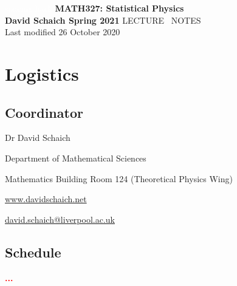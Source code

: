 \documentclass[12 pt]{article}
\newcommand{\mutesection}[1]{\vspace{-\medskipamount}\section*{#1}\vspace{-\medskipamount}}
\newcommand{\mutesubsection}[1]{\vspace{-\medskipamount}\subsection*{#1}\vspace{-\medskipamount}}
\newcommand{\TODO}[1]{\textcolor{red}{\textbf{#1}}}
\begin{document}
\begin{center}
  \textcolor{white}{spacing hack}
  \vfill
  {\LARGE \textbf{MATH327: Statistical Physics}} \\[6 pt]
  \textbf{David Schaich \qquad\qquad\qquad\qquad Spring 2021}
  \vfill
  {\LARGE LECTURE \ NOTES} \\[6 pt]
  Last modified 26 October 2020
  \vfill
\end{center}
\clearpage



\mutesection{Logistics}
\mutesubsection{Coordinator}
\begin{description}
  \setlength{\itemsep}{1pt}
  \setlength{\parskip}{0pt}
  \setlength{\parsep}{0pt}
  \item[\qquad] Dr David Schaich
  \item[\qquad] Department of Mathematical Sciences
  \item[\qquad] Mathematics Building Room 124 (Theoretical Physics Wing)
  \item[\qquad] \href{http://www.davidschaich.net}{www.davidschaich.net}
  \item[\qquad] \href{mailto:david.schaich@liverpool.ac.uk}{david.schaich@liverpool.ac.uk}
\end{description}

\mutesubsection{Schedule}
\TODO{...}
\begin{comment}
\begin{tabular}{|l|p{12cm}|}
  \hline
  \textbf{Weeks 1--7:}  & We will have \textit{three hours of lecture} and \textit{one tutorial}.
                          There will be question sheets for the tutorials.
                          You will work through part of these questions in your time before the tutorial (non-assessed).
                          Key elements will be discussed in the tutorial. \\[12 pt]
  \hline
  \textbf{Week 8--10:}  & We will have \textit{two hours of lecture} and \textit{two hours Computer Lab}.
                          In the Computer Lab sessions, we will study a statistical phenomenon (see page~\pageref{sec:project}) with a computer experiment using MATLAB.
                          A basic introduction to MATLAB will be provided, but familiarising yourself with MATLAB (if needed) could be beneficial.
                          Support material to get started with MATLAB is provided at the VITAL page for MATH327. \\[12 pt]
  \hline
  \textbf{Week 11--12:} & We will have \textit{three hours of lecture} and \textit{one tutorial}.
                          Both will include exam revision sessions. \\[12 pt]
  \hline
\end{tabular}
\end{comment}
\end{document}
